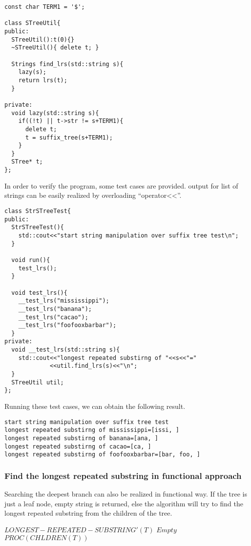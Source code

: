 \documentclass{article}
\begin{document}
\begin{lstlisting}
const char TERM1 = '$';

class STreeUtil{
public:
  STreeUtil():t(0){}
  ~STreeUtil(){ delete t; }

  Strings find_lrs(std::string s){
    lazy(s);
    return lrs(t);
  }

private:
  void lazy(std::string s){
    if((!t) || t->str != s+TERM1){
      delete t;
      t = suffix_tree(s+TERM1);
    }
  }
  STree* t;
};
\end{lstlisting} %

In order to verify the program, some test cases are provided. output
for list of strings can be easily realized by overloading ``operator<<''.

\begin{lstlisting}
class StrSTreeTest{
public:
  StrSTreeTest(){
    std::cout<<"start string manipulation over suffix tree test\n";
  }

  void run(){
    test_lrs();
  }

  void test_lrs(){
    __test_lrs("mississippi");
    __test_lrs("banana");
    __test_lrs("cacao");
    __test_lrs("foofooxbarbar");
  }
private:
  void __test_lrs(std::string s){
    std::cout<<"longest repeated substirng of "<<s<<"="
             <<util.find_lrs(s)<<"\n";
  }
  STreeUtil util;
};
\end{lstlisting}

Running these test cases, we can obtain the following result.
\begin{verbatim}
start string manipulation over suffix tree test
longest repeated substirng of mississippi=[issi, ]
longest repeated substirng of banana=[ana, ]
longest repeated substirng of cacao=[ca, ]
longest repeated substirng of foofooxbarbar=[bar, foo, ]
\end{verbatim}

\subsubsection{Find the longest repeated substring in functional approach}
Searching the deepest branch can also be realized in functional way.
If the tree is just a leaf node, empty string is returned, else the
algorithm will try to find the longest repeated substring from the 
children of the tree.

\begin{algorithmic}
\STATE $LONGEST-REPEATED-SUBSTRING'(T)$
    \RETURN $Empty$
  \ELSE
    \RETURN $PROC(CHLDREN(T))$
  \ENDIF
\end{algorithmic}
\end{document}
